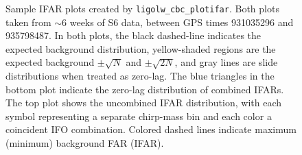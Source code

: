 \begin{figure}[p]
\begin{center}
\end{center}
\label{fig:sample_plotifar}
\caption{Sample IFAR plots created by \texttt{ligolw\_cbc\_plotifar}. Both plots taken from $\sim6$ weeks of \ac{S6} data, between GPS times 931035296 and 935798487. In both plots, the black dashed-line indicates the expected background distribution, yellow-shaded regions are the expected background $\pm \sqrt{N}$ and $\pm \sqrt{2N}$, and gray lines are slide distributions when treated as zero-lag. The blue triangles in the bottom plot indicate the zero-lag distribution of combined IFARs. The top plot shows the uncombined IFAR distribution, with each symbol representing a separate chirp-mass bin and each color a coincident \ac{IFO} combination. Colored dashed lines indicate maximum (minimum) background \ac{FAR} (IFAR).}
\end{figure}

